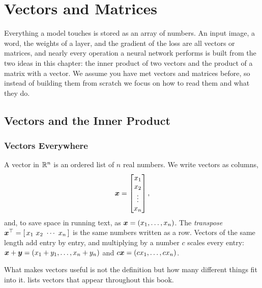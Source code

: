 \chapter{Vectors and Matrices}
\label{chap:ch03}


Everything a model touches is stored as an array of numbers. An input
image, a word, the weights of a layer, and the gradient of the loss are
all vectors or matrices, and nearly every operation a neural network
performs is built from the two ideas in this chapter: the inner product of
two vectors and the product of a matrix with a vector. We assume you have
met vectors and matrices before, so instead of building them from scratch
we focus on how to read them and what they do.

\section{Vectors and the Inner Product}
\label{sec:ch03-vectors}

\subsection{Vectors Everywhere}
\label{sec:ch03-examples}

A vector in $\mathbb{R}^n$ is an ordered list of $n$ real numbers. We write vectors
as columns,
\[
  \bm{x} =
  \begin{bmatrix} x_1 \\ x_2 \\ \vdots \\ x_n \end{bmatrix},
\]
and, to save space in running text, as $\bm{x} = (x_1, \dots, x_n)$. The
\emph{transpose} $\vect{x}^\top = [\, x_1 \ x_2 \ \cdots \ x_n \,]$ is the
same numbers written as a row. Vectors of the same length add entry by
entry, and multiplying by a number $c$ scales every entry:
$\bm{x} + \bm{y} = (x_1 + y_1, \dots, x_n + y_n)$ and
$c\bm{x} = (c x_1, \dots, c x_n)$.

What makes vectors useful is not the definition but how many different
things fit into it.  lists vectors that appear
throughout this book.

